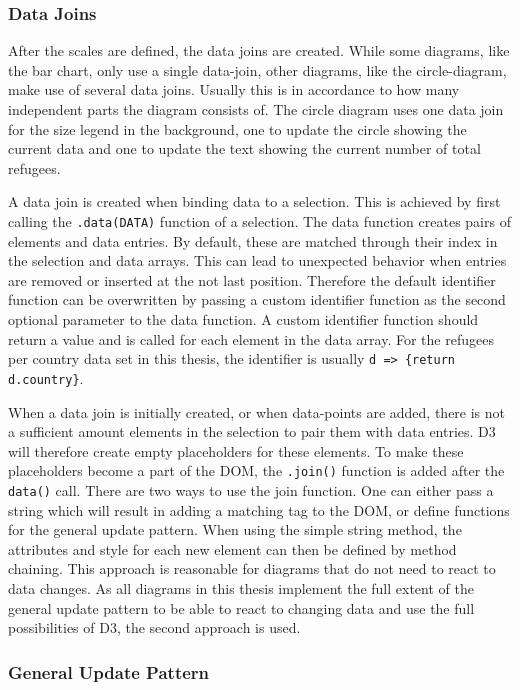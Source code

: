 \subsubsection{Data Joins}
After the scales are defined, the data joins are created. While some diagrams, like the bar chart, only use a single data-join, other diagrams, like the circle-diagram, make use of several data joins. Usually this is in accordance to how many independent parts the diagram consists of. The circle diagram uses one data join for the size legend in the background, one to update the circle showing the current data and one to update the text showing the current number of total refugees.

A data join is created when binding data to a selection. This is achieved by first calling the \verb|.data(DATA)| function of a selection. The data function creates pairs of elements and data entries. By default, these are matched through their index in the selection and data arrays. This can lead to unexpected behavior when entries are removed or inserted at the not last position. Therefore the default identifier function can be overwritten by passing a custom identifier function as the second optional parameter to the data function. A custom identifier function should return a value and is called for each element in the data array. For the refugees per country data set in this thesis, the identifier is usually \verb|d => {return d.country}|.

When a data join is initially created, or when data-points are added, there is not a sufficient amount elements in the selection to pair them with data entries. D3 will therefore create empty placeholders for these elements. To make these placeholders become a part of the DOM, the \verb|.join()| function is added after the \texttt{data()} call. There are two ways to use the join function. One can either pass a string which will result in adding a matching tag to the DOM, or define functions for the general update pattern. When using the simple string method, the attributes and style for each new element can then be defined by method chaining. This approach is reasonable for diagrams that do not need to react to data changes. As all diagrams in this thesis implement the full extent of the general update pattern to be able to react to changing data and use the full possibilities of D3, the second approach is used.

\subsubsection{General Update Pattern}

